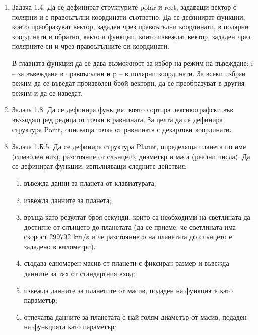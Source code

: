 {\begin{enumerate}
\begin{enumerate}[label=\alph*)]
		\end{enumerate}


	\item Задача 1.4. \cite{sbornik2} Да се дефинират структурите polar и rect, задаващи вектор с полярни и с правоъгълни координати съответно. Да се дефинират функции, които преобразуват вектор, зададен чрез правоъгълни координати, в полярни координати и обратно, както и функции, които извеждат вектор, зададен чрез полярните си и чрез правоъгълните си координати.

	В главната функция да се дава възможност за избор на режим на въвеждане: r – за въвеждане в правоъгълни и p – в полярни координати. За всеки избран режим да се въведат произволен брой вектори, да се преобразуват в другия режим и да се изведат.

	\item Задача 1.8.\cite{sbornik2} \label{zad:structpoint}Да се дефинира функция, която сортира лексикографски във възходящ ред редица от точки в равнината. За целта да се дефинира структура Point, описваща точка от равнината с декартови координати.

	\item Задача 1.Б.5.\cite{sbornik2} Да се дефинира структура Planet, определяща планета по име (символен низ), разстояние от слънцето, диаметър и маса (реални числа). Да се дефинират функции, изпълняващи следните действия:

	\begin{enumerate}[label=\alph*)]%
		\item въвежда данни за планета от клавиатурата;
		\item извежда данните за планета;
		\item  връща като резултат броя секунди, които са необходими на светлината да достигне от слънцето до планетата (да се приеме, че светлината има скорост 299792 km/s и че разстоянието на планетата до слънцето е зададено в километри).
		\item създава едномерен масив от планети с фиксиран размер и въвежда данните за тях от стандартния вход;
		\item извежда данните за планетите от масив, подаден на функцията като параметър;
		\item отпечатва данните за планетата с най-голям диаметър от масив, подаден на функцията като параметър;
	\end{enumerate}


\end{enumerate}

}
